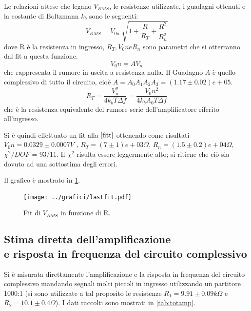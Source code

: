 \documentclass[a4paper,10pt]{article}
\begin{document}
\vspace*{-5pt}
Le relazioni attese che legano $V_{RMS}$, le resistenze utilizzate, i guadagni ottenuti e la costante di Boltzmann $k_b$ sono le seguenti:
\vspace*{-8pt}
\begin{equation}
V_{RMS} = V_{0n} \sqrt[]{1+\frac{R}{R_T}+\frac{R^2}{R_n ^2}}
\label{fitt}
\end{equation}
dove R è la resistenza in ingresso, $R_T, V_0n e R_n$ sono parametri che si otterranno dal fit a questa funzione.
\begin{equation}
V_0n = A V_n
\label{resnull}
\end{equation}
che rappresenta il rumore in uscita a resistenza nulla. Il Guadagno $A$ è quello complessivo di tutto il circuito, cioè $A = A_0 A_1 A_2 A_3 = (1.17\pm0.02)e+05 $.
\vspace*{-10pt}
\begin{equation}
R_T = \frac{V_n^2}{4k_b T \Delta f} = \frac{V_0n^2}{4k_b A_0 T \Delta f}
\label{kb}
\end{equation}
che è la resistenza equivalente del rumore serie dell'amplificatore riferito all'ingresso.

Si è quindi effettuato un fit alla $\eqref{fitt}$ ottenendo come risultati $V_0n = 0.0329\pm0.0007 V$ , $R_T = (7\pm1)e+03 \Omega $, $R_n = (1.5\pm 0.2)e+04 \Omega$, $\chi ^2 /DOF$ = 93/11. Il $\chi ^2$ risulta essere leggermente alto; si ritiene che ciò sia dovuto ad una sottostima degli errori.

Il grafico è mostrato in \cref{fig:lastfit}.
\vspace*{-10pt}
\begin{figure}[H]
	\centering
	\texttt{[image: ../grafici/lastfit.pdf]}
	\vspace*{-15pt}
	\caption{Fit di $V_{RMS}$ in funzione di R.}
	\label{fig:lastfit}
\end{figure}



\subsection{Stima diretta dell'amplificazione \\e risposta in frequenza del circuito complessivo}
Si è misurata direttamente l'amplificazione e la risposta in frequenza del circuito complessivo mandando segnali molti piccoli in ingresso utilizzando un partitore 1000:1 (si sono utilizzate a tal proposito le resistenze $R_1 = 9.91\pm0.09 k\Omega $ e $R_2 = 10.1\pm0.4 \Omega$).
I dati raccolti sono mostrati in \cref{tab:totamp}.
\end{document}
